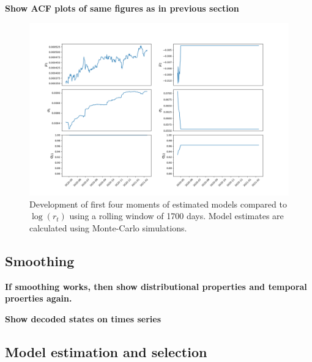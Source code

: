 \textbf{Show ACF plots of same figures as in previous section}

\begin{figure}[H] 
    \centering
    \includegraphics[width=1.0\textwidth]{analysis/stylized_facts/2-state JUMP HMM rolling params.png}
    \caption{Development of first four moments of estimated models compared to $\log(r_t)$ using a rolling window of 1700 days. Model estimates are calculated using Monte-Carlo simulations.}
    \label{fig:stylized_facts_acf_plots} 
\end{figure}

\subsection{Smoothing}

\textbf{If smoothing works, then show distributional properties and temporal proerties again.}

\textbf{Show decoded states on times series}

\subsection{Model estimation and selection}
\label{Subsection: Model estimation and selection}
